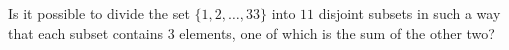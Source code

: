 Is it possible to divide the set $\{1,2,\ldots,33\}$ into $11$ disjoint subsets in such a way 
that each subset contains $3$ elements, one of which is the sum of the other two?
